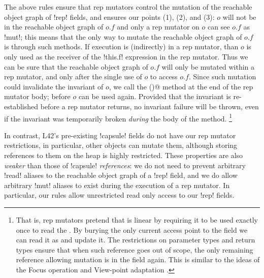 	
\noindent The above rules ensure that rep mutators control the mutation of the reachable object graph of \Q!rep! fields, and 
 ensures our points (1), (2), and (3):
$o$ will not be in the reachable object graph of $o.f$ and
only a rep mutator on $o$ can see $o.f$ as \Q!mut!; this means that the only way to mutate the reachable object graph of $o.f$ is through such methods. 
If execution is (indirectly) in a rep mutator, than $o$ is only used as the receiver of the \Q!this.f! expression in the rep mutator.
Thus we can be sure that the reachable object graph of $o.f$ will only be mutated within a rep mutator, and only after the single use of $o$ to access $o.f$.
Since such mutation could invalidate the invariant of $o$, we call the \Q@invariant()@ method at the end of the rep mutator body; before $o$ can be used again. Provided that the invariant is re-established before a rep mutator returns, no invariant failure will be thrown, even if the invariant was temporarily broken \emph{during} the body of the method.
\footnote{
That is, rep mutators pretend
  that \Q@this@ is linear by requiring it to be used exactly once to read the \Q@rep@. By burying the
  only current access point to the \Q@rep@ field we can read it as \Q@mut@ and update it.
  The restrictions on parameter types and return types ensure that when such reference goes out of
  scope, the only remaining reference allowing mutation is in the \Q@rep@ field again.
  This is similar to the ideas of the Focus operation \cite{??}
 and View-point adaptation \cite{DietlEtAl07}.
}

In contrast, L42's pre-existing \Q!capsule! fields do not have our rep mutator restrictions, in particular, other objects can mutate them, although storing references to them on the heap is highly restricted.
These properties are also \emph{weaker} than those of \Q!capsule! \emph{references}: we do not need to prevent arbitrary \Q!read! aliases to the reachable object graph of a \Q!rep! field, and we do allow arbitrary \Q!mut! aliases to exist during the execution of a rep mutator. In particular, our rules allow unrestricted read only access to our \Q!rep! fields.

